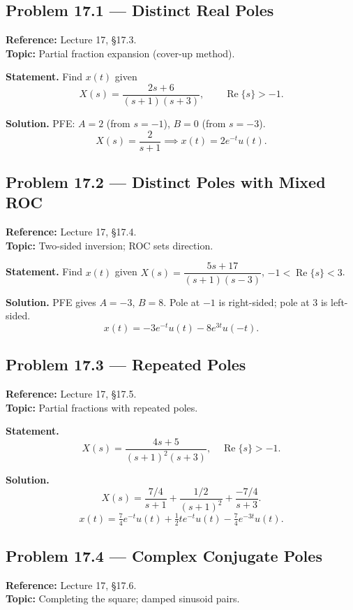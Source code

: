 \documentclass[11pt]{article}
\begin{document}
\subsection{Problem 17.1 --- Distinct Real Poles}
\textbf{Reference:} Lecture 17, \S 17.3.\\
\textbf{Topic:} Partial fraction expansion (cover-up method).

\textbf{Statement.} Find $x(t)$ given
\[
X(s) = \frac{2s+6}{(s+1)(s+3)},\qquad \operatorname{Re}\{s\}>-1.
\]

\textbf{Solution.} PFE: $A=2$ (from $s=-1$), $B=0$ (from $s=-3$).
\[
X(s) = \frac{2}{s+1} \implies \boxed{x(t) = 2 e^{-t}u(t)}.
\]

\subsection{Problem 17.2 --- Distinct Poles with Mixed ROC}
\textbf{Reference:} Lecture 17, \S 17.4.\\
\textbf{Topic:} Two-sided inversion; ROC sets direction.

\textbf{Statement.} Find $x(t)$ given $X(s) = \dfrac{5s+17}{(s+1)(s-3)}$, $-1<\operatorname{Re}\{s\}<3$.

\textbf{Solution.} PFE gives $A=-3$, $B=8$. Pole at $-1$ is right-sided; pole at $3$ is left-sided.
\[
\boxed{x(t) = -3e^{-t}u(t) - 8e^{3t}u(-t)}.
\]

\subsection{Problem 17.3 --- Repeated Poles}
\textbf{Reference:} Lecture 17, \S 17.5.\\
\textbf{Topic:} Partial fractions with repeated poles.

\textbf{Statement.}
\[
X(s) = \frac{4s+5}{(s+1)^2 (s+3)},\quad \operatorname{Re}\{s\}>-1.
\]

\textbf{Solution.}
\[
X(s) = \frac{7/4}{s+1} + \frac{1/2}{(s+1)^2} + \frac{-7/4}{s+3}.
\]
\[
\boxed{x(t) = \tfrac{7}{4}e^{-t}u(t) + \tfrac{1}{2}te^{-t}u(t) - \tfrac{7}{4}e^{-3t}u(t)}.
\]

\subsection{Problem 17.4 --- Complex Conjugate Poles}
\textbf{Reference:} Lecture 17, \S 17.6.\\
\textbf{Topic:} Completing the square; damped sinusoid pairs.
\end{document}
